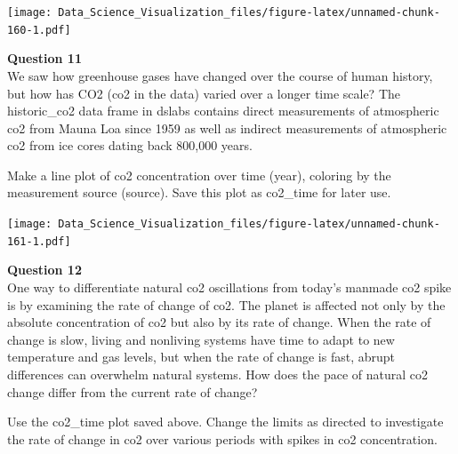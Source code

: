 \documentclass[
]{article}
\newenvironment{Shaded}{\begin{snugshade}}{\end{snugshade}}
\newcommand{\DataTypeTok}[1]{\textcolor[rgb]{0.13,0.29,0.53}{#1}}
\newcommand{\KeywordTok}[1]{\textcolor[rgb]{0.13,0.29,0.53}{\textbf{#1}}}
\newcommand{\NormalTok}[1]{#1}
\newcommand{\OperatorTok}[1]{\textcolor[rgb]{0.81,0.36,0.00}{\textbf{#1}}}
\newcommand{\StringTok}[1]{\textcolor[rgb]{0.31,0.60,0.02}{#1}}
\begin{document}
\begin{Shaded}
\end{Shaded}

\texttt{[image: Data\_Science\_Visualization\_files/figure-latex/unnamed-chunk-160-1.pdf]}

\textbf{Question 11}\\
We saw how greenhouse gases have changed over the course of human
history, but how has CO2 (co2 in the data) varied over a longer time
scale? The historic\_co2 data frame in dslabs contains direct
measurements of atmospheric co2 from Mauna Loa since 1959 as well as
indirect measurements of atmospheric co2 from ice cores dating back
800,000 years.

Make a line plot of co2 concentration over time (year), coloring by the
measurement source (source). Save this plot as co2\_time for later use.

\begin{Shaded}
\end{Shaded}

\texttt{[image: Data\_Science\_Visualization\_files/figure-latex/unnamed-chunk-161-1.pdf]}

\textbf{Question 12}\\
One way to differentiate natural co2 oscillations from today's manmade
co2 spike is by examining the rate of change of co2. The planet is
affected not only by the absolute concentration of co2 but also by its
rate of change. When the rate of change is slow, living and nonliving
systems have time to adapt to new temperature and gas levels, but when
the rate of change is fast, abrupt differences can overwhelm natural
systems. How does the pace of natural co2 change differ from the current
rate of change?

Use the co2\_time plot saved above. Change the limits as directed to
investigate the rate of change in co2 over various periods with spikes
in co2 concentration.
\end{document}

